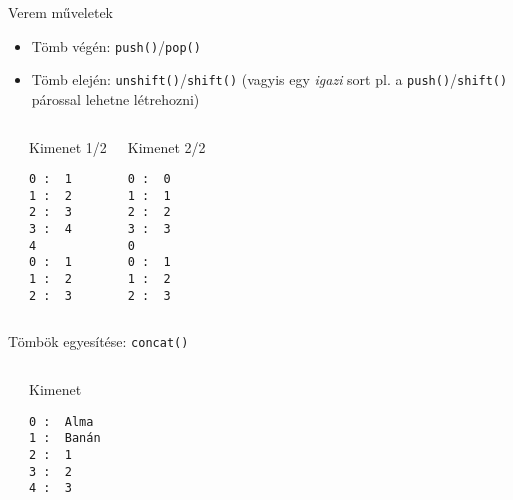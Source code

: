 \begin{frame}[fragile]
  \small
  Verem műveletek
  \begin{itemize}
    \item Tömb végén: \texttt{push()}/\texttt{pop()}
    \item Tömb elején: \texttt{unshift()}/\texttt{shift()} (vagyis egy \emph{igazi} sort pl. a \texttt{push()}/\texttt{shift()} párossal lehetne létrehozni)
  \end{itemize}
  \scriptsize
  \begin{columns}[T]
      \begin{exampleblock}{}
        
      \end{exampleblock}
      \begin{block}{Kimenet 1/2}
        \begin{verbatim}
0 :  1
1 :  2
2 :  3
3 :  4
4
0 :  1
1 :  2
2 :  3
\end{verbatim}
      \end{block}
      \begin{block}{Kimenet 2/2}
        \begin{verbatim}
0 :  0
1 :  1
2 :  2
3 :  3
0
0 :  1
1 :  2
2 :  3
\end{verbatim}
      \end{block}
  \end{columns}
\end{frame}

\begin{frame}[fragile]
  Tömbök egyesítése: \texttt{concat()}
  \vfill
  \small
  \begin{columns}[T]
      \begin{exampleblock}{}
        
      \end{exampleblock}
      \begin{block}{Kimenet}
        \begin{verbatim}
0 :  Alma
1 :  Banán
2 :  1
3 :  2
4 :  3
\end{verbatim}
      \end{block}
  \end{columns}
\end{frame}


